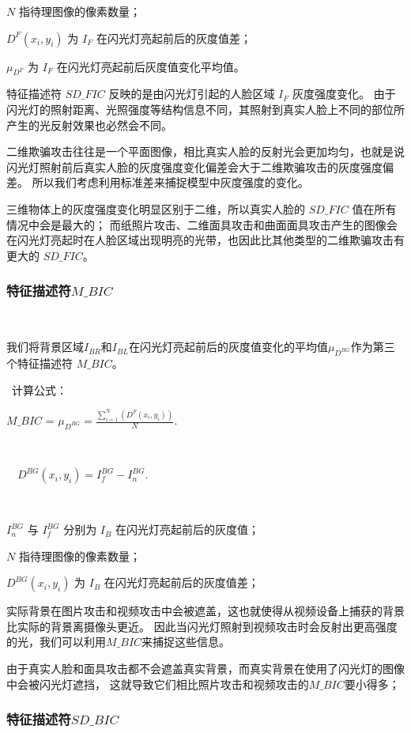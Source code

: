 \documentclass[conference]{IEEEtran}
\begin{document}
$N$ 指待理图像的像素数量；

$D^{F}(x_i,y_i)$ 为 $I_F$ 在闪光灯亮起前后的灰度值差；

$\mu_{D^{F}}$ 为 $I_F$ 在闪光灯亮起前后灰度值变化平均值。

特征描述符 $SD \_ FIC$ 反映的是由闪光灯引起的人脸区域 $I_F$ 灰度强度变化。
由于闪光灯的照射距离、光照强度等结构信息不同，其照射到真实人脸上不同的部位所产生的光反射效果也必然会不同。

二维欺骗攻击往往是一个平面图像，相比真实人脸的反射光会更加均匀，也就是说闪光灯照射前后真实人脸的灰度强度变化偏差会大于二维欺骗攻击的灰度强度偏差。
所以我们考虑利用标准差来捕捉模型中灰度强度的变化。

三维物体上的灰度强度变化明显区别于二维，所以真实人脸的 $SD \_ FIC$ 值在所有情况中会是最大的；
而纸照片攻击、二维面具攻击和曲面面具攻击产生的图像会在闪光灯亮起时在人脸区域出现明亮的光带，也因此比其他类型的二维欺骗攻击有更大的 $SD \_ FIC$。


\subsubsection{特征描述符$M \_ BIC$}
\ 

我们将背景区域$I_{BR}$和$I_{BL}$在闪光灯亮起前后的灰度值变化的平均值$\mu_{D^{BG}}$作为第三个特征描述符 $M \_ BIC$。

\ 
计算公式：

{$M \_ BIC$ = $\mu_{D^{BG}} = {\displaystyle\frac{\sum_{i=1}^{N}(D^{F}(x_i,y_i))}{N}}.$}

\ 

\ \ {$D^{BG}(x_i,y_i) = I_f^{BG} - I_n^{BG}.$}

\ 

$I_n^{BG}$ 与 $I_f^{BG}$ 分别为 $I_B$ 在闪光灯亮起前后的灰度值；

$N$ 指待理图像的像素数量；

$D^{BG}(x_i,y_i)$ 为 $I_B$ 在闪光灯亮起前后的灰度值差；

实际背景在图片攻击和视频攻击中会被遮盖，这也就使得从视频设备上捕获的背景比实际的背景离摄像头更近。
因此当闪光灯照射到视频攻击时会反射出更高强度的光，我们可以利用$M \_ BIC$来捕捉这些信息。

由于真实人脸和面具攻击都不会遮盖真实背景，而真实背景在使用了闪光灯的图像中会被闪光灯遮挡，
这就导致它们相比照片攻击和视频攻击的$M \_ BIC$要小得多；

\subsubsection{特征描述符$SD \_ BIC$}
\ 
\end{document}
